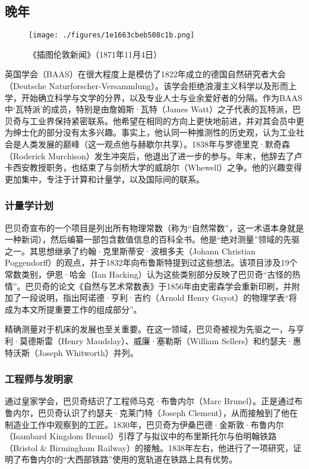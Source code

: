 \subsection{晚年}
\begin{figure}[ht]
\centering
\texttt{[image: ./figures/1e1663cbeb508c1b.png]}
\caption{《插图伦敦新闻》（1871年11月4日）} \label{fig_CRSBQ_2}
\end{figure}
英国学会（BAAS）在很大程度上是模仿了1822年成立的德国自然研究者大会（Deutsche Naturforscher-Versammlung）。该学会拒绝浪漫主义科学以及形而上学，开始确立科学与文学的分界，以及专业人士与业余爱好者的分隔。作为BAAS中‘瓦特派’的成员，特别是由詹姆斯·瓦特（James Watt）之子代表的瓦特派，巴贝奇与工业界保持紧密联系。他希望在相同的方向上更快地前进，并对其会员中更为绅士化的部分没有太多兴趣。事实上，他认同一种推测性的历史观，认为工业社会是人类发展的巅峰（这一观点他与赫歇尔共享）。1838年与罗德里克·默奇森（Roderick Murchison）发生冲突后，他退出了进一步的参与。年末，他辞去了卢卡西安教授职务，也结束了与剑桥大学的威胡尔（Whewell）之争。他的兴趣变得更加集中，专注于计算和计量学，以及国际间的联系。
\subsubsection{计量学计划}
巴贝奇宣布的一个项目是列出所有物理常数（称为“自然常数”，这一术语本身就是一种新词），然后编纂一部包含数值信息的百科全书。他是“绝对测量”领域的先驱之一。其思想继承了约翰·克里斯蒂安·波根多夫（Johann Christian Poggendorff）的观点，并于1832年向布鲁斯特提到过这些想法。该项目涉及19个常数类别，伊恩·哈金（Ian Hacking）认为这些类别部分反映了巴贝奇“古怪的热情”。巴贝奇的论文《自然与艺术常数表》于1856年由史密森学会重新印刷，并附加了一段说明，指出阿诺德·亨利·吉约（Arnold Henry Guyot）的物理学表“将成为本文所提重要工作的组成部分”。

精确测量对于机床的发展也至关重要。在这一领域，巴贝奇被视为先驱之一，与亨利·莫德斯雷（Henry Maudslay）、威廉·塞勒斯（William Sellers）和约瑟夫·惠特沃斯（Joseph Whitworth）并列。
\subsubsection{工程师与发明家}
通过皇家学会，巴贝奇结识了工程师马克·布鲁内尔（Marc Brunel）。正是通过布鲁内尔，巴贝奇认识了约瑟夫·克莱门特（Joseph Clement），从而接触到了他在制造业工作中观察到的工匠。1830年，巴贝奇为伊桑巴德·金斯敦·布鲁内尔（Isambard Kingdom Brunel）引荐了与拟议中的布里斯托尔与伯明翰铁路（Bristol & Birmingham Railway）的接触。1838年左右，他进行了一项研究，证明了布鲁内尔的“大西部铁路”使用的宽轨道在铁路上具有优势。

